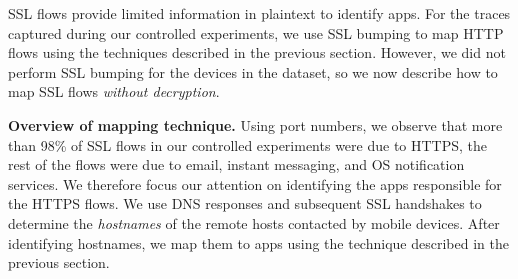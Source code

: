 SSL flows provide limited information in plaintext to identify apps. 
For the traces captured during our controlled experiments, we use SSL bumping to map HTTP flows using the techniques described in the previous section. 
However, we did not perform SSL bumping for the devices in the \mobWild dataset, so we now describe how to 
map SSL flows \emph{without decryption}. 

\noindent\textbf{Overview of mapping technique.}
Using port numbers, we observe that more than 98\% of SSL flows in our controlled experiments were due to HTTPS, the rest of the flows were due to email, instant messaging, and OS notification services. 
We therefore focus our attention on identifying the apps responsible for the HTTPS flows.
We use DNS responses and subsequent SSL handshakes to determine the \emph{hostnames} of the remote hosts contacted by mobile devices.
After identifying hostnames, we map them to apps using the technique described in the previous section.




